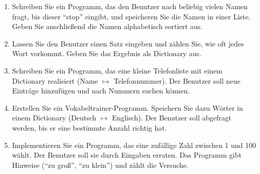 \documentclass[11pt, a4paper, oneside]{article}
\begin{document}
	\begin{enumerate}[label=\alph*)]
		\item Schreiben Sie ein Programm, das den Benutzer nach beliebig vielen Namen fragt, bis dieser ``stop'' eingibt, und speicheren Sie die Namen in einer Liste.
		Geben Sie anschließend die Namen alphabetisch sortiert aus.
		\item Lassen Sie den Benutzer einen Satz eingeben und zählen Sie, wie oft jedes Wort vorkommt.
		Geben Sie das Ergebnis als Dictionary aus.
		\item Schreiben Sie ein Programm, das eine kleine Telefonliste mit einem Dictionary realisiert (Name $\mapsto$ Telefonnummer).
		Der Benutzer soll neue Einträge hinzufügen und nach Nummern suchen können.
		\item Erstellen Sie ein Vokabeltrainer-Programm.
		Speichern Sie dazu Wörter in einem Dictionary (Deutsch $\mapsto$ Englisch).
		Der Benutzer soll abgefragt werden, bis er eine bestimmte Anzahl richtig hat.
		\item Implementieren Sie ein Programm, das eine zufällige Zahl zwischen 1 und 100 wählt.
		Der Benutzer soll sie durch Eingaben erraten.
		Das Programm gibt Hinweise (``zu groß'', ``zu klein'') und zählt die Versuche.
	\end{enumerate}
\end{document}
